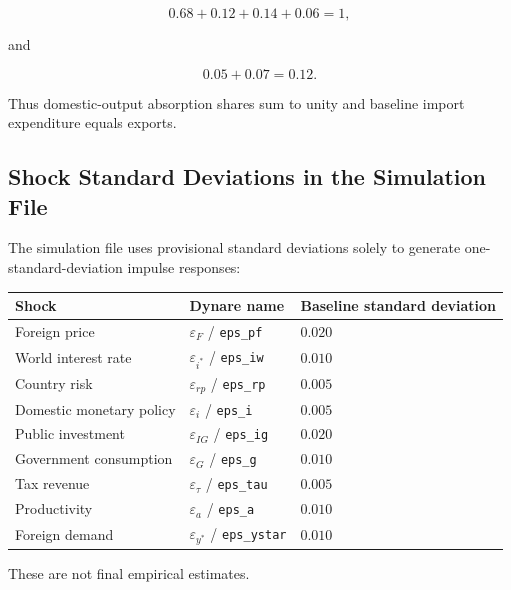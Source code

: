 \begin{equation}
0.68+0.12+0.14+0.06=1,
\end{equation}

and

\begin{equation}
0.05+0.07=0.12.
\end{equation}

Thus domestic-output absorption shares sum to unity and baseline import
expenditure equals exports.

\subsection{Shock Standard Deviations in the Simulation File}
\label{app:shock_sd}

The simulation file uses provisional standard deviations solely to generate
one-standard-deviation impulse responses:

\begin{center}
\begin{tabular}{lll}
\hline
Shock & Dynare name & Baseline standard deviation \\
\hline
Foreign price & \(\varepsilon_F\) / \texttt{eps\_pf} & \(0.020\) \\
World interest rate & \(\varepsilon_{i^*}\) / \texttt{eps\_iw} & \(0.010\) \\
Country risk & \(\varepsilon_{rp}\) / \texttt{eps\_rp} & \(0.005\) \\
Domestic monetary policy & \(\varepsilon_i\) / \texttt{eps\_i} & \(0.005\) \\
Public investment & \(\varepsilon_{IG}\) / \texttt{eps\_ig} & \(0.020\) \\
Government consumption & \(\varepsilon_G\) / \texttt{eps\_g} & \(0.010\) \\
Tax revenue & \(\varepsilon_\tau\) / \texttt{eps\_tau} & \(0.005\) \\
Productivity & \(\varepsilon_a\) / \texttt{eps\_a} & \(0.010\) \\
Foreign demand & \(\varepsilon_{y^*}\) / \texttt{eps\_ystar} & \(0.010\) \\
\hline
\end{tabular}
\end{center}

These are not final empirical estimates.

